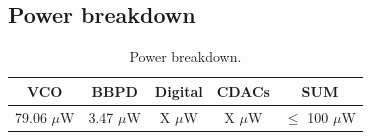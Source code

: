 \subsection{Power breakdown}

		\begin{table}[htb!]
			\centering
			\def\arraystretch{1.5}		
			\setlength\arrayrulewidth{0.75pt}
			\setlength{\tabcolsep}{1em} %
			\begin{tabular}{|c|c|c|c|c|}
				\hline 
				\rule[-1ex]{0pt}{2.5ex} \cellcolor{gray!40}\textbf{VCO} & \cellcolor{gray!40}\textbf{BBPD} & \cellcolor{gray!40}\textbf{Digital}& \cellcolor{gray!40}\textbf{CDACs} & \cellcolor{gray!40}\textbf{SUM} \\ 
				\hline 
				\rule[-1ex]{0pt}{2.5ex} 79.06 $\mu$W& 3.47 $\mu$W &  X $\mu$W  & X $ \mu$W & $\leq$ 100  $\mu$W\\ 
				\hline 
			\end{tabular} 
			\caption{Power breakdown.}
			\label{tab:power_bkdn}
		\end{table}   



